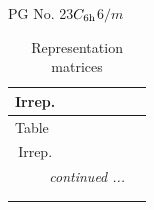 \documentclass[fleqn,8pt,landscape]{jsarticle}
\begin{document}
\setcounter{MaxMatrixCols}{32}

\renewcommand{\tablename}{Table~}
\renewcommand{\figurename}{Figure~}
\begin{center}
\LARGE
PG No. 23\quad$C_{\rm 6h}$\quad$6/m$\quad[ hexagonal ]
\end{center}
\renewcommand{\arraystretch}{1.2}
\begin{longtable}{ccccccc}
\caption{Representation matrices}
 \\
 \hline \hline
Irrep. &  &  &  &  &  &  \\ \hline \endfirsthead

\multicolumn{6}{l}{\tablename\ \thetable{}} \\
 \hline \hline
Irrep. &  &  &  &  &  &  \\ \hline \endhead

 \hline \hline
\multicolumn{6}{r}{\footnotesize\it continued ...} \\ \endfoot

 \hline \hline
\multicolumn{6}{r}{} \\ \endlastfoot


\end{longtable}
\end{document}
